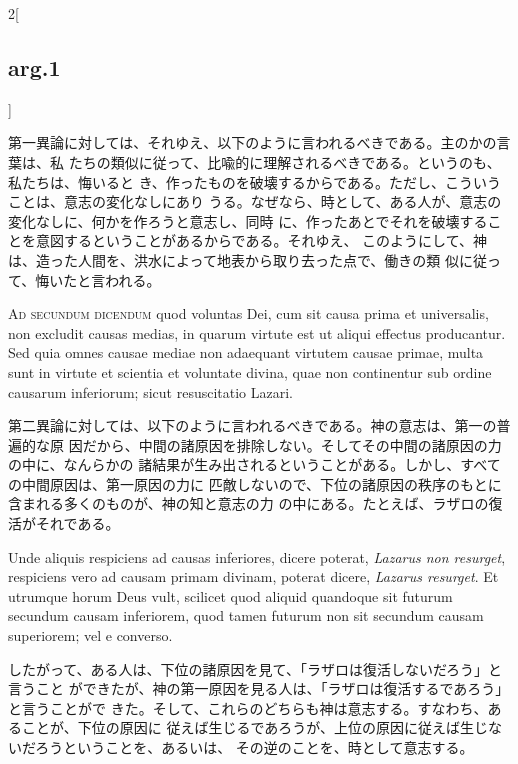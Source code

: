 \documentclass[paper=a4paper,fontsize=10pt,jafontsize=9pt,titlepage]{jlreq}
\begin{document}
\begin{paracol}{2}[\subsection{arg.1}]
\switchcolumn

第一異論に対しては、それゆえ、以下のように言われるべきである。主のかの言葉は、私
たちの類似に従って、比喩的に理解されるべきである。というのも、私たちは、悔いると
き、作ったものを破壊するからである。ただし、こういうことは、意志の変化なしにあり
うる。なぜなら、時として、ある人が、意志の変化なしに、何かを作ろうと意志し、同時
に、作ったあとでそれを破壊することを意図するということがあるからである。それゆえ、
このようにして、神は、造った人間を、洪水によって地表から取り去った点で、働きの類
似に従って、悔いたと言われる。

\switchcolumn*[\subsection{ad.2}]


{\scshape Ad secundum dicendum} quod voluntas Dei, cum sit causa prima et
 universalis, non excludit causas medias, in quarum virtute est ut aliqui
 effectus producantur. Sed quia omnes causae mediae non adaequant virtutem
 causae primae, multa sunt in virtute et scientia et voluntate divina, quae non
 continentur sub ordine causarum inferiorum; sicut resuscitatio Lazari.

\switchcolumn

第二異論に対しては、以下のように言われるべきである。神の意志は、第一の普遍的な原
因だから、中間の諸原因を排除しない。そしてその中間の諸原因の力の中に、なんらかの
諸結果が生み出されるということがある。しかし、すべての中間原因は、第一原因の力に
匹敵しないので、下位の諸原因の秩序のもとに含まれる多くのものが、神の知と意志の力
の中にある。たとえば、ラザロの復活がそれである。

\switchcolumn*


Unde aliquis respiciens ad causas inferiores, dicere poterat, {\itshape Lazarus
 non resurget}, respiciens vero ad causam primam divinam, poterat dicere,
 {\itshape Lazarus resurget}. Et utrumque horum Deus vult, scilicet quod aliquid
 quandoque sit futurum secundum causam inferiorem, quod tamen futurum non sit
 secundum causam superiorem; vel e converso.

\switchcolumn

したがって、ある人は、下位の諸原因を見て、「ラザロは復活しないだろう」と言うこと
 ができたが、神の第一原因を見る人は、「ラザロは復活するであろう」と言うことがで
 きた。そして、これらのどちらも神は意志する。すなわち、あることが、下位の原因に
 従えば生じるであろうが、上位の原因に従えば生じないだろうということを、あるいは、
 その逆のことを、時として意志する。


\end{paracol}
\end{document}

